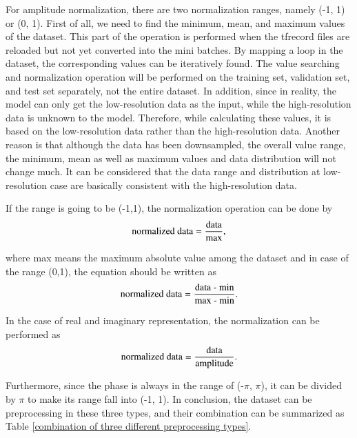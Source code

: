 For amplitude normalization, there are two normalization ranges, namely (-1, 1) or (0, 1). First of all, we need to find the minimum, mean, and maximum values of the dataset. This part of the operation is performed when the \gls{tfrecord} files are reloaded but not yet converted into the mini batches. By mapping a loop in the dataset, the corresponding values can be iteratively found. The value searching and normalization operation will be performed on the training set, validation set, and test set separately, not the entire dataset. In addition, since in reality, the model can only get the low-resolution data as the input, while the high-resolution data is unknown to the model. Therefore, while calculating these values, it is based on the low-resolution data rather than the high-resolution data. Another reason is that although the data has been downsampled, the overall value range, the minimum, mean as well as maximum values and data distribution will not change much. It can be considered that the data range and distribution at low-resolution case are basically consistent with the high-resolution data.

If the range is going to be (-1,1), the normalization operation can be done by
\begin{equation}
    \centering
    \text{normalized data} = \frac{\text{data}}{\text{max}},
\end{equation}

where max means the maximum absolute value among the dataset and in case of the range (0,1), the equation should be written as
\begin{equation}
    \centering
    \text{normalized data} = \frac{\text{data - min}}{\text{max - min}}.
\end{equation}

In the case of real and imaginary representation, the normalization can be performed as 
\begin{equation}
    \centering
    \text{normalized data} = \frac{\text{data}}{\text{amplitude}}.
\end{equation}

Furthermore, since the phase is always in the range of (-\(\pi\), \(\pi\)), it can be divided by \(\pi\) to make its range fall into (-1, 1). In conclusion, the dataset can be preprocessing in these three types, and their combination can be summarized as Table \ref{combination of three different preprocessing types}.

